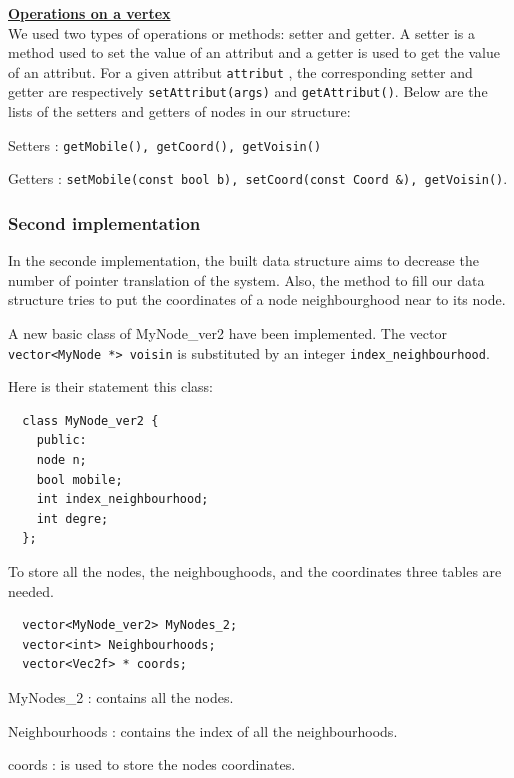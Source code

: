 \noindent
\underline{\bf Operations on a vertex}~\\
We used two types of operations or methods: \textsf{setter} and
\textsf{getter}. A \textsf{setter} is a method used to set the value of an
attribut and a \textsf{getter} is used to get the value of an attribut. For
a given attribut \texttt{attribut} , the corresponding setter and getter
are respectively \verb+setAttribut(args)+ and \verb+getAttribut()+. Below
are the lists of the setters and getters of nodes in our structure:
\begin{dinglist}{70}
\item[Setters]: \verb+getMobile(), getCoord(), getVoisin()+  
\item[Getters]: \verb+setMobile(const bool b), setCoord(const Coord &), getVoisin()+.
\end{dinglist}

\subsubsection{Second implementation}
In the seconde implementation, the built data structure aims to decrease
the number of pointer translation of the system. Also, the method to fill
our data structure tries to put the coordinates of a node neighbourghood
near to its node.

A new basic class of MyNode\_ver2 have been implemented. The vector \\
\verb+vector<MyNode *> voisin+ is substituted by an integer \verb+index_neighbourhood+.

Here is their statement this class:

\newpage
\begin{lstlisting}
  class MyNode_ver2 {
    public:
    node n;
    bool mobile;
    int index_neighbourhood;
    int degre;
  };
\end{lstlisting}

To store all the nodes, the neighboughoods, and the coordinates three tables are needed. 

\begin{lstlisting}
  vector<MyNode_ver2> MyNodes_2;
  vector<int> Neighbourhoods;
  vector<Vec2f> * coords;
\end{lstlisting}

\begin{dinglist}{70}
\item[MyNodes\_2]: contains all the nodes.
\item[Neighbourhoods]: contains the index of all the neighbourhoods.
\item[coords]: is used to store the nodes coordinates. 
\end{dinglist}

